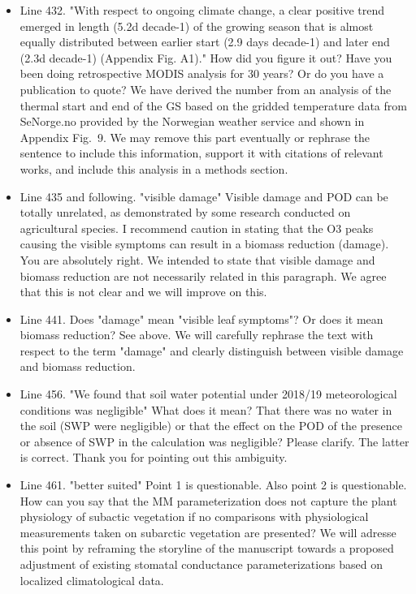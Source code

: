 \documentclass{scrartcl}
\begin{document}
\begin{itemize}
\item {\color{blue}Line 432. "With respect to ongoing climate change, a clear positive trend emerged in length (5.2d decade-1) of the growing season that is almost equally distributed between earlier start (2.9 days decade-1) and later end (2.3d decade-1) (Appendix Fig. A1)." How did you figure it out? Have you been doing retrospective MODIS analysis for 30 years? Or do you have a publication to quote?}
We have derived the number from an analysis of the thermal start and end of the GS based on the gridded temperature data from SeNorge.no provided by the Norwegian weather service and shown in Appendix Fig.~9. We may remove this part eventually or rephrase the sentence to include this information, support it with citations of relevant works, and include this analysis in a methods section.

\item {\color{blue}Line 435 and following. "visible damage"
Visible damage and POD can be totally unrelated, as demonstrated by some research
conducted on agricultural species. I recommend caution in stating that the O3 peaks
causing the visible symptoms can result in a biomass reduction (damage).}
You are absolutely right. We intended to state that visible damage and biomass reduction are not necessarily related in this paragraph. We agree that this is not clear and we will improve on this.

\item {\color{blue}Line 441. Does "damage" mean "visible leaf symptoms"? Or does it mean biomass reduction?}
See above. We will carefully rephrase the text with respect to the term "damage" and clearly distinguish between visible damage and biomass reduction.

\item {\color{blue}Line 456. "We found that soil water potential under 2018/19 meteorological conditions was negligible" What does it mean? That there was no water in the soil (SWP were negligible) or that the effect on the POD of the presence or absence of SWP in the calculation was negligible? Please clarify.}
The latter is correct. Thank you for pointing out this ambiguity.

\item {\color{blue}Line 461. "better suited" Point 1 is questionable.
Also point 2 is questionable. How can you say that the MM parameterization does not
capture the plant physiology of subactic vegetation if no comparisons with physiological measurements taken on subarctic vegetation are presented?}
We will adresse this point by reframing the storyline of the manuscript towards a proposed  adjustment of existing stomatal conductance parameterizations based on localized climatological data.


\end{itemize}
\end{document}
